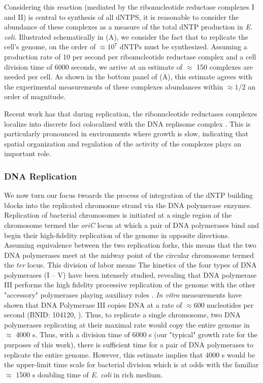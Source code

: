 Considering this reaction (mediated by the ribonucleotide reductase complexes I
and II) is central to synthesis of all dNTPS, it is reasonable to consider the
abundance of these complexes as a measure of the total dNTP production in
\textit{E. coli}. Illustrated schematically in (A), we
consider the fact that to replicate the cell's genome, on the order of $\approx
10^7$ dNTPs must be synthesized. Assuming a production rate of 10 per second per
ribonucleotide reductase complex and a cell division time of 6000 seconds, we
arrive at an estimate of $\approx$ 150 complexes are needed per cell. As shown
in the bottom panel of (A), this estimate agrees with the
experimental measurements of these complexes abundances within $\approx 1/2$ an
order of magnitude. 

Recent work has that during replication, the ribonucleotide reductases complexes
localize into discrete foci colocalized with the DNA replisome complex
\citep{sanchez-romero2011}. This is particularly pronounced in environments
where growth is slow, indicating that spatial organization and regulation of the
activity of the complexes plays an important role. 


\subsubsection{DNA Replication}
We now turn our focus twoards the process of integration of the dNTP building
blocks into the replicated chromosme strand via the DNA polymerase enzymes.
Replication of bacterial chromosomes is initiated at a single region of the
chromosome termed the \textit{oriC} locus at which a pair of DNA polymerases
bind and begin their high-fidelity replication of the genome in opposite
directions. Assuming equivalence between the two replication forks, this
means that the two DNA polymerases meet at the midway point of the circular
chromosome termed the \textit{ter} locus. This division of labor means The
kinetics of the four types of DNA polymerases (I -- V) have been intensely
studied, revealing that DNA polymerase III performs the high fidelity
processive replication of the genome with the other "accessory" polymerases
playing auxiliary roles \cite{fijalkowska2012}. \textit{In vitro}
measurements have shown that DNA Polymerase III copies DNA at a rate of
$\approx 600$ nucleotides per second (BNID: 104120, \cite{milo2010}). Thus,
to replicate a single chromosome, two DNA polymerases replicating at their
maximal rate would copy the entire genome in $\approx$ 4000 s. Thus, with a
division time of 6000 s (our "typical" growth rate for the purposes of this
work), there is sufficient time for a pair of DNA polymerases to replicate
the entire genome. However, this estimate implies that 4000 s would be the
upper-limit time scale for bacterial division which is at odds with the
familiar $\approx$ 1500 s doubling time of \textit{E. coli} in rich medium.


